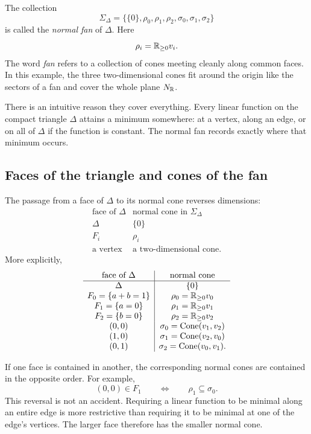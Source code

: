 The collection
\[
\Sigma_{\Delta}
=
\bigl\{
\{0\},
\rho_0,\rho_1,\rho_2,
\sigma_0,\sigma_1,\sigma_2
\bigr\}
\]
is called the \emph{normal fan} of \(\Delta\). Here
\[
\rho_i=\mathbb{R}_{\geq0}v_i.
\]
The word \emph{fan} refers to a collection of cones meeting cleanly
along common faces. In this example, the three two-dimensional cones
fit around the origin like the sectors of a fan and cover the whole
plane \(N_{\mathbb{R}}\).

There is an intuitive reason they cover everything. Every linear
function on the compact triangle \(\Delta\) attains a minimum
somewhere: at a vertex, along an edge, or on all of \(\Delta\) if the
function is constant. The normal fan records exactly where that
minimum occurs.

\subsection{Faces of the triangle and cones of the fan}

The passage from a face of \(\Delta\) to its normal cone reverses
dimensions:
\[
\begin{array}{c|c}
\text{face of }\Delta & \text{normal cone in }\Sigma_\Delta\\
\hline
\Delta & \{0\}\\
F_i & \rho_i\\
\text{a vertex} & \text{a two-dimensional cone}.
\end{array}
\]
More explicitly,
\[
\begin{array}{c|c}
\text{face of }\Delta & \text{normal cone}\\
\hline
\Delta & \{0\}\\
F_0=\{a+b=1\} & \rho_0=\mathbb{R}_{\geq0}v_0\\
F_1=\{a=0\} & \rho_1=\mathbb{R}_{\geq0}v_1\\
F_2=\{b=0\} & \rho_2=\mathbb{R}_{\geq0}v_2\\
(0,0) & \sigma_0=\operatorname{Cone}(v_1,v_2)\\
(1,0) & \sigma_1=\operatorname{Cone}(v_2,v_0)\\
(0,1) & \sigma_2=\operatorname{Cone}(v_0,v_1).
\end{array}
\]

If one face is contained in another, the corresponding normal cones
are contained in the opposite order. For example,
\[
(0,0)\in F_1
\qquad\Longleftrightarrow\qquad
\rho_1\subseteq\sigma_0.
\]
This reversal is not an accident. Requiring a linear function to be
minimal along an entire edge is more restrictive than requiring it to
be minimal at one of the edge's vertices. The larger face therefore
has the smaller normal cone.

